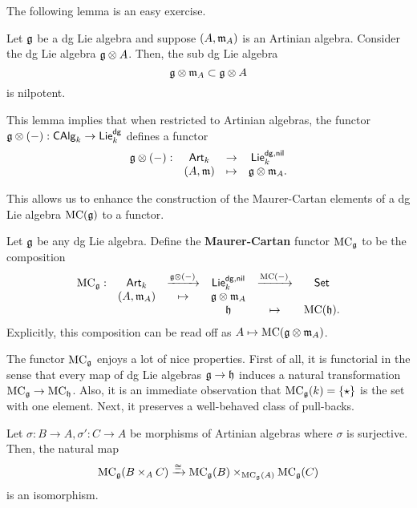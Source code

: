 \documentclass[11pt]{amsart}
\def\dgLie{{\sf Lie}^{\sf dg}}
\def\dgLienil{{\sf Lie}^{\sf dg, nil}}
\begin{document}
The following lemma is an easy exercise. 

\begin{lem}
Let $\mathfrak g$ be a dg Lie algebra and suppose $(A,{\mathfrak m}_A)$ is an Artinian algebra.
Consider the dg Lie algebra $\mathfrak g \otimes A$. 
Then, the sub dg Lie algebra
\[
\mathfrak g \otimes {\mathfrak m}_A \subset \mathfrak g \otimes A
\]
is nilpotent.
\end{lem}

This lemma implies that when restricted to Artinian algebras, the functor $\fg \tensor (-) : \CAlg_k \to \dgLie_k$ defines a functor
\[
\begin{array}{cccc}
\fg \tensor (-) : & \Art_k & \to & \dgLienil_k \\
& (A,\fm) & \mapsto & \fg \tensor \fm_A .
\end{array}
\]

This allows us to enhance the construction of the Maurer-Cartan elements of a dg Lie algebra ${\rm MC}(\mathfrak g)$ to a functor.

\begin{dfn}
Let $\mathfrak g$ be any dg Lie algebra.
Define the {\bf Maurer-Cartan} functor ${\rm MC}_\mathfrak g$ to be the composition
\[
\begin{array}{cccccccc}
\MC_\fg: & \Art_k & \xto{\fg \tensor (-)} & \dgLienil_k & \xto{\MC(-)} & \Set \\
& (A,\fm_A) & \mapsto & \fg \tensor \fm_A & & \\
& & & \fh & \mapsto & \MC(\fh) .
\end{array}
\]
Explicitly, this composition can be read off as $A \mapsto {\rm MC}(\mathfrak g \otimes {\mathfrak m}_A)$. 
\end{dfn}

The functor ${\rm MC}_\mathfrak g$ enjoys a lot of nice properties. 
First of all, it is functorial in the sense that every map of dg Lie algebras $\mathfrak g \to \mathfrak h$ induces a natural transformation ${\rm MC}_\mathfrak g \to {\rm MC}_\mathfrak h$. 
Also, it is an immediate observation that ${\rm MC}_\mathfrak g(k) = \{\star\}$ is the set with one element. 
Next, it preserves a well-behaved class of pull-backs. 

\begin{ex}
\label{ex: MC}
Let $\sigma : B \to A, \sigma' : C \to A$ be morphisms of Artinian algebras where $\sigma$ is surjective.
Then, the natural map
\[
{\rm MC}_\mathfrak g(B \times_A C) \xrightarrow{\cong} {\rm MC}_\mathfrak g(B) \times_{{\rm MC}_\mathfrak g(A)} {\rm MC}_\mathfrak g(C)
\]
is an isomorphism.
\end{ex}
\end{document}
